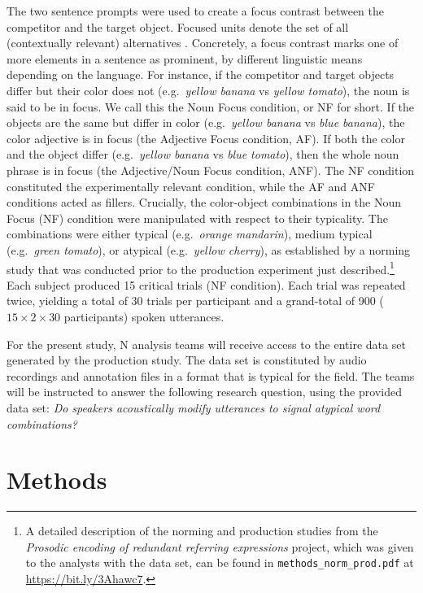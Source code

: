 \documentclass[Review,times,sageh]{sagej}
\begin{document}
The two sentence prompts were used to create a focus contrast between the competitor and the target object.
Focused units denote the set of all (contextually relevant) alternatives \citep[e.g.][]{rooth1992theory}.
Concretely, a focus contrast marks one of more elements in a sentence as prominent, by different linguistic means depending on the language.
For instance, if the competitor and target objects differ but their color does not (e.g.~\emph{yellow banana} vs \emph{yellow tomato}), the noun is said to be in focus.
We call this the Noun Focus condition, or NF for short.
If the objects are the same but differ in color (e.g.~\emph{yellow banana} vs \emph{blue banana}), the color adjective is in focus (the Adjective Focus condition, AF).
If both the color and the object differ (e.g.~\emph{yellow banana} vs \emph{blue tomato}), then the whole noun phrase is in focus (the Adjective/Noun Focus condition, ANF).
The NF condition constituted the experimentally relevant condition, while the AF and ANF conditions acted as fillers.
Crucially, the color-object combinations in the Noun Focus (NF) condition were manipulated with respect to their typicality.
The combinations were either typical (e.g.~\emph{orange mandarin}), medium typical (e.g.~\emph{green tomato}), or atypical (e.g.~\emph{yellow cherry}), as established by a norming study that was conducted prior to the production experiment just described.\footnote{A detailed description of the norming and production studies from the \emph{Prosodic encoding of redundant referring expressions} project, which was given to the analysts with the data set, can be found in \texttt{methods\_norm\_prod.pdf} at \url{https://bit.ly/3Ahawc7}.}
Each subject produced 15 critical trials (NF condition).
Each trial was repeated twice, yielding a total of 30 trials per participant and a grand-total of 900 (\(15 \times 2 \times 30\) participants) spoken utterances.

For the present study, N analysis teams will receive access to the entire data set generated by the production study.
The data set is constituted by audio recordings and annotation files in a format that is typical for the field.
The teams will be instructed to answer the following research question, using the provided data set: \emph{Do speakers acoustically modify utterances to signal atypical word combinations?}

\hypertarget{methods}{%
\section{Methods}\label{methods}}
\end{document}
